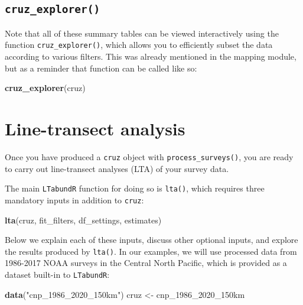 \documentclass[
]{book}
\newenvironment{Shaded}{\begin{snugshade}}{\end{snugshade}}
\newcommand{\DecValTok}[1]{\textcolor[rgb]{0.00,0.00,0.81}{#1}}
\newcommand{\KeywordTok}[1]{\textcolor[rgb]{0.13,0.29,0.53}{\textbf{#1}}}
\newcommand{\NormalTok}[1]{#1}
\newcommand{\StringTok}[1]{\textcolor[rgb]{0.31,0.60,0.02}{#1}}
\begin{document}
\hypertarget{cruz_explorer}{%
\section*{\texorpdfstring{\texttt{cruz\_explorer()}}{cruz\_explorer()}}\label{cruz_explorer}}

Note that all of these summary tables can be viewed interactively using the function \texttt{cruz\_explorer()},
which allows you to efficiently subset the data according to various filters. This was already mentioned in the mapping module, but as a reminder that function can be called like so:

\begin{Shaded}
\begin{Highlighting}[]
\KeywordTok{cruz_explorer}\NormalTok{(cruz)}
\end{Highlighting}
\end{Shaded}

\hypertarget{lta}{%
\chapter{Line-transect analysis}\label{lta}}

Once you have produced a \texttt{cruz} object with \texttt{process\_surveys()}, you are ready to carry out line-transect analyses (LTA) of your survey data.

The main \texttt{LTabundR} function for doing so is \texttt{lta()}, which requires three mandatory inputs in addition to \texttt{cruz}:

\begin{Shaded}
\begin{Highlighting}[]
\KeywordTok{lta}\NormalTok{(cruz,}
\NormalTok{    fit_filters,}
\NormalTok{    df_settings,}
\NormalTok{    estimates)}
\end{Highlighting}
\end{Shaded}

Below we explain each of these inputs, discuss other optional inputs, and explore the results produced by \texttt{lta()}. In our examples, we will use processed data from 1986-2017 NOAA surveys in the Central North Pacific, which is provided as a dataset built-in to \texttt{LTabundR}:

\begin{Shaded}
\begin{Highlighting}[]
\KeywordTok{data}\NormalTok{(}\StringTok{"cnp_1986_2020_150km"}\NormalTok{)}
\NormalTok{cruz <-}\StringTok{ }\NormalTok{cnp_}\DecValTok{1986}\NormalTok{_}\DecValTok{2020}\NormalTok{_150km}
\end{Highlighting}
\end{Shaded}
\end{document}
